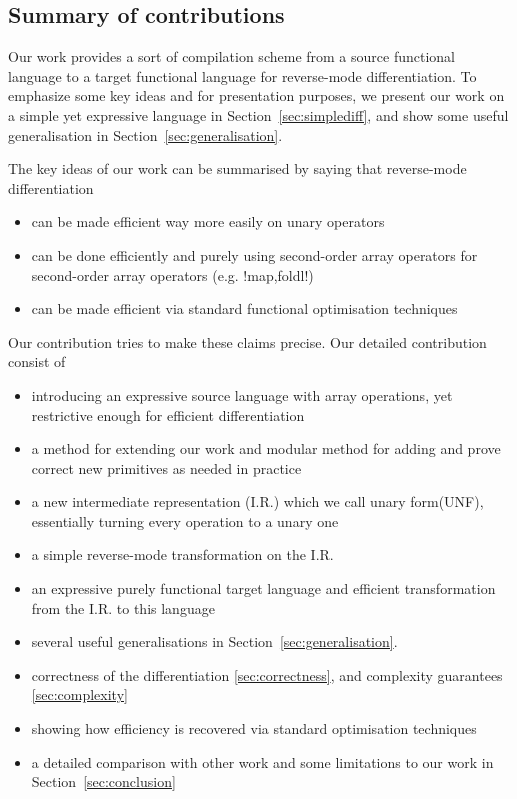 \subsection{Summary of contributions}

Our work provides a sort of compilation scheme from a source functional language to a target functional language for reverse-mode differentiation.
To emphasize some key ideas and for presentation purposes, we present our work on a simple yet expressive language in Section~\ref{sec:simplediff}, 
and show some useful generalisation in Section~\ref{sec:generalisation}. 

The key ideas of our work can be summarised by saying that reverse-mode differentiation
\begin{itemize}
   \item can be made efficient way more easily on unary operators
   \item can be done efficiently and purely using second-order array operators for second-order array operators (e.g. !map,foldl!) 
   \item can be made efficient via standard functional optimisation techniques
\end{itemize}

Our contribution tries to make these claims precise. Our detailed  contribution consist of
\begin{itemize}
    \item introducing an expressive source language with array operations, yet restrictive enough for efficient differentiation
    \item a method for extending our work and modular method for adding and prove correct new primitives as needed in practice 
    \item a new intermediate representation (I.R.) which we call unary form(UNF), essentially turning every operation to a unary one
    \item a simple reverse-mode transformation on the I.R.
    \item an expressive purely functional target language and efficient transformation from the I.R. to this language
    \item several useful generalisations in Section~\ref{sec:generalisation}. 
    \item correctness of the differentiation \ref{sec:correctness}, and complexity guarantees \ref{sec:complexity}
    \item showing how efficiency  is recovered via standard optimisation techniques
    \item a detailed comparison with other work and some limitations to our work in Section~\ref{sec:conclusion}
\end{itemize}


